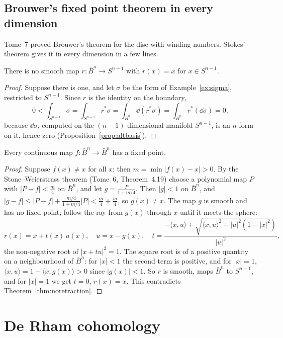 \subsection*{Brouwer's fixed point theorem in every dimension}

Tome~7 proved Brouwer's theorem for the disc with winding numbers. Stokes' theorem gives it in every dimension in a few lines.

\begin{theorem}\label{thm:noretraction}
There is no smooth map $r\colon\bar B^n\to S^{n-1}$ with $r(x)=x$ for $x\in S^{n-1}$.
\end{theorem}
\begin{proof}
Suppose there is one, and let $\sigma$ be the form of Example~\ref{ex:sigma}, restricted to $S^{n-1}$. Since $r$ is the identity on the boundary,
\[
0<\int_{S^{n-1}}\sigma=\int_{S^{n-1}}r^*\sigma=\int_{\bar B^n}\dd(r^*\sigma)=\int_{\bar B^n}r^*(\dd\sigma)=0,
\]
because $\dd\sigma$, computed on the $(n-1)$-dimensional manifold $S^{n-1}$, is an $n$-form on it, hence zero (Proposition~\ref{prop:altbasis}).
\end{proof}

\begin{theorem}[Brouwer]\label{thm:brouwern}
Every continuous map $f\colon\bar B^n\to\bar B^n$ has a fixed point.
\end{theorem}
\begin{proof}
Suppose $f(x)\ne x$ for all $x$; then $m=\min|f(x)-x|>0$. By the Stone--Weierstrass theorem (Tome~6, Theorem~4.19) choose a polynomial map $P$ with
$|P-f|<\frac m4$ on $\bar B^n$, and let $g=\frac P{1+m/4}$. Then $|g|<1$ on $\bar B^n$, and $|g-f|\le|P-f|+\frac{m/4}{1+m/4}|P|<\frac m4+\frac m4$, so $g(x)\ne x$. The map $g$
is smooth and has no fixed point; follow the ray from $g(x)$ through $x$ until it meets the sphere:
\[
r(x)=x+t(x)\,u(x),\quad u=x-g(x),\quad t=\frac{-\langle x,u\rangle+\sqrt{\langle x,u\rangle^2+|u|^2(1-|x|^2)}}{|u|^2},
\]
the non-negative root of $|x+tu|^2=1$. The square root is of a positive quantity on a neighbourhood of $\bar B^n$: for $|x|<1$ the second term is positive, and for
$|x|=1$, $\langle x,u\rangle=1-\langle x,g(x)\rangle>0$ since $|g(x)|<1$. So $r$ is smooth, maps $\bar B^n$ to $S^{n-1}$, and for $|x|=1$ we get $t=0$, $r(x)=x$. This contradicts
Theorem~\ref{thm:noretraction}.
\end{proof}

\section{De Rham cohomology}

